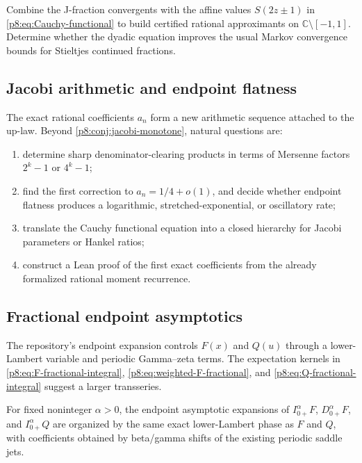 \documentclass[11pt,oneside]{article}
\theoremstyle{definition}
\theoremstyle{remark}
\newcommand{\C}{\mathbb C}
\newcommand{\1}{\mathbf 1}
\begin{document}
\begin{problem}
Combine the J-fraction convergents with the affine values
\(S(2z\pm1)\) in \eqref{p8:eq:Cauchy-functional} to build certified rational
approximants on \(\C\setminus[-1,1]\).  Determine whether the dyadic equation
improves the usual Markov convergence bounds for Stieltjes continued fractions.
\end{problem}

\subsection{Jacobi arithmetic and endpoint flatness}

The exact rational coefficients \(a_n\) form a new arithmetic sequence attached
to the up-law.  Beyond \cref{p8:conj:jacobi-monotone}, natural questions are:
\begin{enumerate}
\item determine sharp denominator-clearing products in terms of Mersenne
      factors \(2^k-1\) or \(4^k-1\);
\item find the first correction to \(a_n=1/4+o(1)\), and decide whether endpoint
      flatness produces a logarithmic, stretched-exponential, or oscillatory
      rate;
\item translate the Cauchy functional equation into a closed hierarchy for
      Jacobi parameters or Hankel ratios;
\item construct a Lean proof of the first exact coefficients from the already
      formalized rational moment recurrence.
\end{enumerate}

\subsection{Fractional endpoint asymptotics}

The repository's endpoint expansion controls \(F(x)\) and \(Q(u)\) through a
lower-Lambert variable and periodic Gamma--zeta terms.  The expectation kernels
in \eqref{p8:eq:F-fractional-integral}, \eqref{p8:eq:weighted-F-fractional}, and
\eqref{p8:eq:Q-fractional-integral} suggest a larger transseries.

\begin{conjecture}
For fixed noninteger \(\alpha>0\), the endpoint asymptotic expansions of
\(I_{0+}^{\alpha}F\), \(D_{0+}^{\alpha}F\), and
\(I_{0+}^{\alpha}Q\) are organized by the same exact lower-Lambert phase as
\(F\) and \(Q\), with coefficients obtained by beta/gamma shifts of the
existing periodic saddle jets.
\statusconjecture
\end{conjecture}
\end{document}
